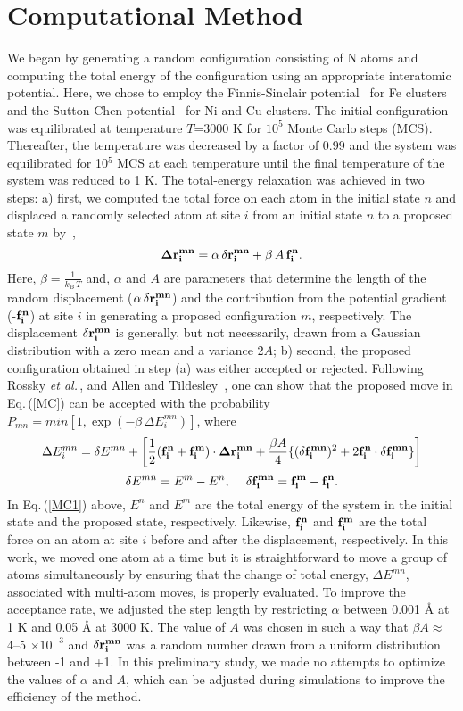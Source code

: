 \documentclass[a4paper]{jpconf}
\def\be{\begin{equation}}
\def\ee{\end{equation}}
\def\etal{\it et al.\,}
\begin{document}
\section{Computational Method}
We began by generating a random configuration consisting 
of N atoms and computing the total energy of the configuration 
using an appropriate interatomic potential. Here, we chose to employ 
the Finnis-Sinclair potential~\cite{Finnis1984} for Fe 
clusters and the Sutton-Chen potential~\cite{Sutton} 
for Ni and Cu clusters. The initial configuration 
was equilibrated at temperature $T$=3000 K for $10^5$ 
Monte Carlo steps (MCS). Thereafter, the temperature 
was decreased by a factor of 0.99 and the system was 
equilibrated for 10$^5$ MCS at each temperature 
until the final temperature of the system was reduced 
to 1 K. The total-energy relaxation was achieved in two steps: 
a) first, we computed the total force on each atom 
in the initial state $n$ and displaced a randomly 
selected atom at site $i$ from an initial state $n$ 
to a proposed state $m$ by~\cite{Rossky1978,Pangali}, 
\be 
{\bf \Delta r_i^{mn}} = \alpha \, {\bf \delta r_i^{mn}} + \beta \, A\, {\bf f_i^n}. 
\label{MC}
\ee
%
Here, $\beta=\frac{1}{k_B\,T}$ and, $\alpha$ and $A$ are parameters 
that determine the length of the random displacement 
(${\alpha\,\bf \delta r_i^{mn}}$) and the contribution from the 
potential gradient (-${\bf f_i^n}$) at site $i$ in generating 
a proposed configuration $m$, respectively.  The 
displacement ${\bf \delta r_i^{mn}}$ is generally, but not 
necessarily, drawn from a Gaussian distribution with a zero mean and a variance $2A$; 
b) second, the proposed configuration obtained in step (a) 
was either accepted or rejected. Following Rossky 
{\etal}\cite{Rossky1978}, and Allen and Tildesley~\cite{Allen}, 
one can show that the proposed move in Eq.\,(\ref{MC}) can 
be accepted with the probability $P_{mn} = min[1,\exp(-\beta\,\Delta E^{mn}_i)]$, where 
\be 
\Delta E^{mn}_i = \delta E^{mn} + \left[\frac{1}{2}({\bf f_i^n+f_i^m}) \cdot {\bf \Delta r_i^{mn}} 
+ \frac{\beta A}{4}\{({\bf \delta f_i^{mn}})^2 + 2{\bf f_i^n \cdot \delta f_i^{mn}}\}\right]
\label{MC1}
\ee 
\[ 
\delta E^{mn} = E^m -E^n,  \: \quad {\bf \delta f_i^{mn} = f_i^m - f_i^n}. 
\] 
In Eq.\,(\ref{MC1}) above, $E^n$ and $E^m$ are the total energy of the system in the initial 
state and the proposed state, respectively. Likewise, ${\bf f_i^n}$ and 
${\bf f_i^m}$ are the total force on an atom at site $i$ before and 
after the displacement, respectively. In this work, we moved one 
atom at a time but it is straightforward to move a group of atoms 
simultaneously by ensuring that the change of total energy, $\Delta E^{mn}$, 
associated with multi-atom moves, is properly evaluated.  To improve 
the acceptance rate, we adjusted the step length by 
restricting $\alpha$ between 0.001 {\AA} at 1 K and 
0.05 {\AA} at 3000 K. The value of $A$ was chosen in such a way 
that $\beta A \approx$ 4--5 $\times 10^{-3}$ and ${\bf \delta r_i^{mn}}$ 
was a random number drawn from a uniform distribution between -1 and +1. 
In this preliminary study, we made no attempts to optimize the values 
of $\alpha$ and $A$, which can be adjusted during simulations to improve 
the efficiency of the method.  
\end{document}
